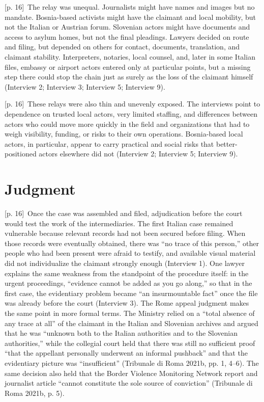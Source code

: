 \documentclass[10pt,a4paper]{article}
\begin{document}
{\scriptsize\color{gray} [p. 16]}\ The relay was unequal. Journalists might have names and images but no mandate. Bosnia-based activists might have the claimant and local mobility, but not the Italian or Austrian forum. Slovenian actors might have documents and access to asylum homes, but not the final pleadings. Lawyers decided on route and filing, but depended on others for contact, documents, translation, and claimant stability. Interpreters, notaries, local counsel, and, later in some Italian files, embassy or airport actors entered only at particular points, but a missing step there could stop the chain just as surely as the loss of the claimant himself (Interview 2; Interview 3; Interview 5; Interview 9).\par
{\scriptsize\color{gray} [p. 16]}\ These relays were also thin and unevenly exposed. The interviews point to dependence on trusted local actors, very limited staffing, and differences between actors who could move more quickly in the field and organizations that had to weigh visibility, funding, or risks to their own operations. Bosnia-based local actors, in particular, appear to carry practical and social risks that better-positioned actors elsewhere did not (Interview 2; Interview 5; Interview 9).\par
{}\section*{Judgment}
{\scriptsize\color{gray} [p. 16]}\ Once the case was assembled and filed, adjudication before the court would test the work of the intermediaries. The first Italian case remained vulnerable because relevant records had not been secured before filing. When those records were eventually obtained, there was “no trace of this person,” other people who had been present were afraid to testify, and available visual material did not individualize the claimant strongly enough (Interview 1). One lawyer explains the same weakness from the standpoint of the procedure itself: in the urgent proceedings, “evidence cannot be added as you go along,” so that in the first case, the evidentiary problem became “an insurmountable fact” once the file was already before the court (Interview 3). The Rome appeal judgment makes the same point in more formal terms. The Ministry relied on a “total absence of any trace at all” of the claimant in the Italian and Slovenian archives and argued that he was “unknown both to the Italian authorities and to the Slovenian authorities,” while the collegial court held that there was still no sufficient proof “that the appellant personally underwent an informal pushback” and that the evidentiary picture was “insufficient” (Tribunale di Roma 2021b, pp. 1, 4–6). The same decision also held that the Border Violence Monitoring Network report and journalist article “cannot constitute the sole source of conviction” (Tribunale di Roma 2021b, p. 5).\par
\end{document}

